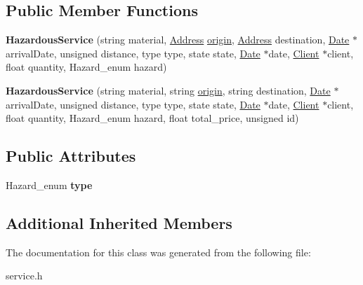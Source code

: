 \subsection*{Public Member Functions}
\begin{DoxyCompactItemize}
\item 
\mbox{\label{class_hazardous_service_afcd54cb1f6917720b1845c80e8503827}} 
{\bfseries Hazardous\+Service} (string material, \hyperlink{class_address}{Address} \hyperlink{class_service_a4abd0a104d97e5bdb8e8ca93bab31ce7}{origin}, \hyperlink{class_address}{Address} destination, \hyperlink{class_date}{Date} $\ast$arrival\+Date, unsigned distance, type type, state state, \hyperlink{class_date}{Date} $\ast$date, \hyperlink{class_client}{Client} $\ast$client, float quantity, Hazard\+\_\+enum hazard)
\item 
\mbox{\label{class_hazardous_service_af33995d8d0934550a13aa8439c825f9b}} 
{\bfseries Hazardous\+Service} (string material, string \hyperlink{class_service_a4abd0a104d97e5bdb8e8ca93bab31ce7}{origin}, string destination, \hyperlink{class_date}{Date} $\ast$arrival\+Date, unsigned distance, type type, state state, \hyperlink{class_date}{Date} $\ast$date, \hyperlink{class_client}{Client} $\ast$client, float quantity, Hazard\+\_\+enum hazard, float total\+\_\+price, unsigned id)
\end{DoxyCompactItemize}
\subsection*{Public Attributes}
\begin{DoxyCompactItemize}
\item 
\mbox{\label{class_hazardous_service_a210252b82d2999d1743d2d695798a555}} 
Hazard\+\_\+enum {\bfseries type}
\end{DoxyCompactItemize}
\subsection*{Additional Inherited Members}


The documentation for this class was generated from the following file\+:\begin{DoxyCompactItemize}
\item 
service.\+h\end{DoxyCompactItemize}
